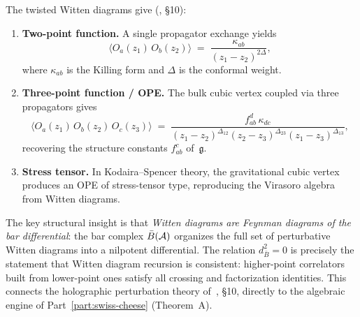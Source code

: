 \begin{proposition}
\label{prop:witten-2pt-3pt}
The twisted Witten diagrams give \textup{(}\!\cite{CG18}, \S10\textup{)}:
\begin{enumerate}[label=\textup{(\roman*)}]
\item \textbf{Two-point function.} A single propagator exchange yields
 \begin{equation}\label{eq:witten-2pt}
 \bigl\langle O_a(z_1)\, O_b(z_2) \bigr\rangle
 \;=\;
 \frac{\kappa_{ab}}{(z_1 - z_2)^{2\Delta}},
 \end{equation}
 where $\kappa_{ab}$ is the Killing form and $\Delta$ is the conformal
 weight.
\item \textbf{Three-point function / OPE.} The bulk cubic vertex coupled
 via three propagators gives
 \begin{equation}\label{eq:witten-3pt}
 \bigl\langle O_a(z_1)\, O_b(z_2)\, O_c(z_3) \bigr\rangle
 \;=\;
 \frac{f^{d}_{ab}\,\kappa_{dc}}
 {(z_1 - z_2)^{\Delta_{12}}(z_2 - z_3)^{\Delta_{23}}(z_1 - z_3)^{\Delta_{13}}},
 \end{equation}
 recovering the structure constants $f^c_{ab}$ of~$\mathfrak{g}$.
\item \textbf{Stress tensor.} In Kodaira--Spencer theory, the gravitational
 cubic vertex produces an OPE of stress-tensor type, reproducing the
 Virasoro algebra from Witten diagrams.
\end{enumerate}
\end{proposition}

\begin{remark}
\label{rem:witten-bar-differential}
The key structural insight is that \emph{Witten diagrams are Feynman
diagrams of the bar differential}: the bar complex $\bar{B}(\mathcal A)$ organizes
the full set of perturbative Witten diagrams into a nilpotent
differential. The relation $d_{\bar{B}}^2 = 0$ is precisely the
statement that Witten diagram recursion is consistent: higher-point
correlators built from lower-point ones satisfy all crossing and
factorization identities. This connects the holographic perturbation
theory of~\cite{CG18}, \S10, directly to the algebraic engine of
Part~\ref{part:swiss-cheese} (Theorem~A).
\end{remark}

